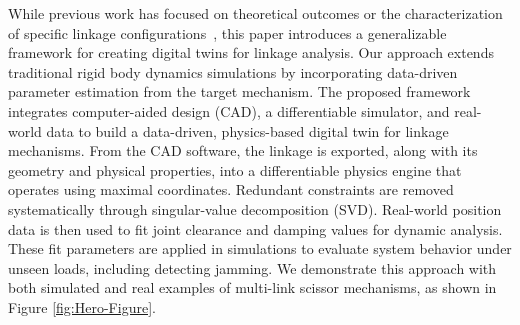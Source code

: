 While previous work has focused on theoretical outcomes or the characterization of specific linkage configurations~\cite{funabashi_dynamic_1978, soong_theoretical_1990, dupont_jamming_1994, akhadkar_influence_2014, tan_continuous_2017}, this paper introduces a generalizable framework for creating digital twins for linkage analysis. Our approach extends traditional rigid body dynamics simulations by incorporating data-driven parameter estimation from the target mechanism. The proposed framework integrates computer-aided design (CAD), a differentiable simulator, and real-world data to build a data-driven, physics-based digital twin for linkage mechanisms. From the CAD software, the linkage is exported, along with its geometry and physical properties, into a differentiable physics engine that operates using maximal coordinates. Redundant constraints are removed systematically through singular-value decomposition (SVD). Real-world position data is then used to fit joint clearance and damping values for dynamic analysis. These fit parameters are applied in simulations to evaluate system behavior under unseen loads, including detecting jamming. We demonstrate this approach with both simulated and real examples of multi-link scissor mechanisms, as shown in Figure \ref{fig:Hero-Figure}.


